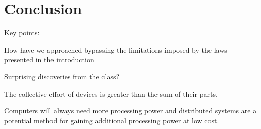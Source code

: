 \chapter{Conclusion} \label{ch:conclussion}

Key points:

    How have we approached bypassing the limitations imposed by the laws presented in the introduction

    Surprising discoveries from the class?

    The collective effort of devices is greater than the sum of their parts.

    Computers will always need more processing power and distributed systems are a potential method for gaining additional processing power at low cost.


